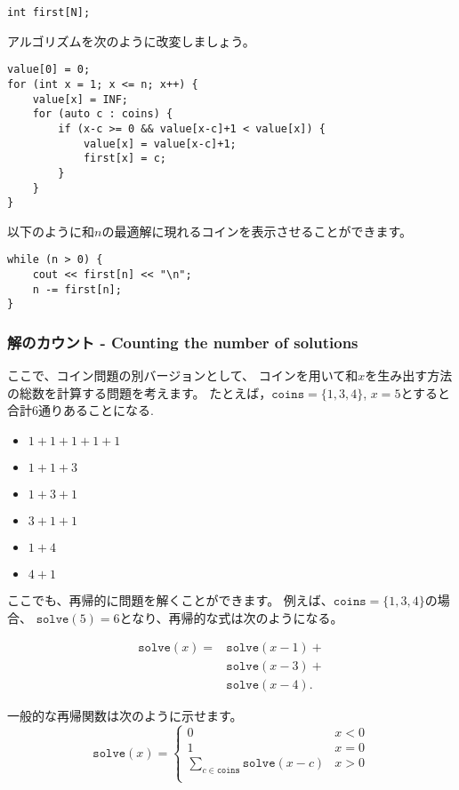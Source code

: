 \begin{lstlisting}
int first[N];
\end{lstlisting}
アルゴリズムを次のように改変しましょう。
\begin{lstlisting}
value[0] = 0;
for (int x = 1; x <= n; x++) {
    value[x] = INF;
    for (auto c : coins) {
        if (x-c >= 0 && value[x-c]+1 < value[x]) {
            value[x] = value[x-c]+1;
            first[x] = c;
        }
    }
}
\end{lstlisting}
以下のように和$n$の最適解に現れるコインを表示させることができます。
\begin{lstlisting}
while (n > 0) {
    cout << first[n] << "\n";
    n -= first[n];
}
\end{lstlisting}

\subsubsection{解のカウント - Counting the number of solutions}

ここで、コイン問題の別バージョンとして、
コインを用いて和$x$を生み出す方法 の総数を計算する問題を考えます。
たとえば，$\texttt{coins}=\{1,3,4\}$, $x=5$とすると
合計6通りあることになる.

\begin{multicols}{2}
\begin{itemize}
\item $1+1+1+1+1$
\item $1+1+3$
\item $1+3+1$
\item $3+1+1$
\item $1+4$
\item $4+1$
\end{itemize}
\end{multicols}

ここでも、再帰的に問題を解くことができます。
例えば、$\texttt{coins}=\{1,3,4\}$の場合、
$\texttt{solve}(5)=6$となり、再帰的な式は次のようになる。

\begin{equation*}
\begin{split}
\texttt{solve}(x) = & \texttt{solve}(x-1) + \\
                    & \texttt{solve}(x-3) + \\
                    & \texttt{solve}(x-4)  .
\end{split}
\end{equation*}

一般的な再帰関数は次のように示せます。
\begin{equation*}
    \texttt{solve}(x) = \begin{cases}
               0               & x < 0\\
               1               & x = 0\\
               \sum_{c \in \texttt{coins}} \texttt{solve}(x-c) & x > 0 \\
           \end{cases}
\end{equation*}

